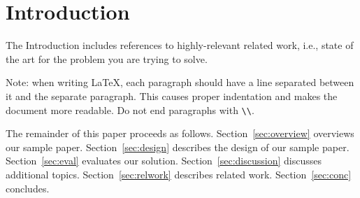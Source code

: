 \section{Introduction}

The Introduction includes references to highly-relevant related work,
i.e., state of the art for the problem you are trying to solve.

Note: when writing \LaTeX, each paragraph should have a line separated
between it and the separate paragraph. This causes proper indentation
and makes the document more readable. Do not end paragraphs with
\verb/\\/.

The remainder of this paper proceeds as follows.
Section~\ref{sec:overview} overviews our sample paper.
Section~\ref{sec:design} describes the design of our sample paper.
Section~\ref{sec:eval} evaluates our solution.
Section~\ref{sec:discussion} discusses additional topics.
Section~\ref{sec:relwork} describes related work. Section~\ref{sec:conc}
concludes.
